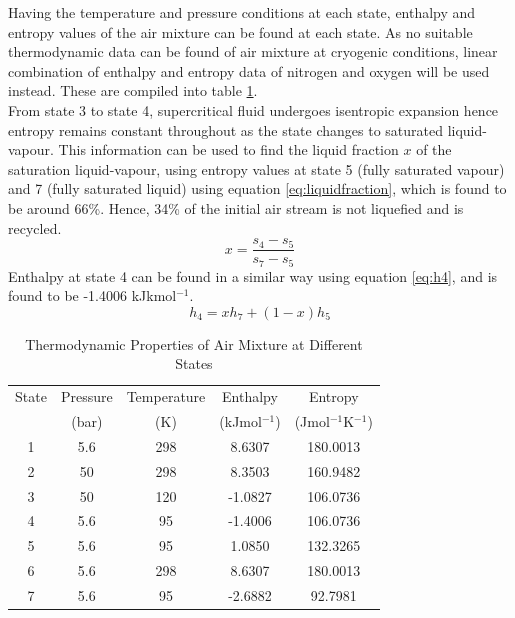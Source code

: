         \noindent Having the temperature and pressure conditions at each state, enthalpy and entropy values of the air mixture can be found at each state. As no suitable thermodynamic data can be found of air mixture at cryogenic conditions, linear combination of enthalpy and entropy data of nitrogen and oxygen will be used instead. These are compiled into table \ref{table:air_thermodata}. \\
        From state 3 to state 4, supercritical fluid undergoes isentropic expansion hence entropy remains constant throughout as the state changes to saturated liquid-vapour. This information can be used to find the liquid fraction $x$ of the saturation liquid-vapour, using entropy values at state 5 (fully saturated vapour) and 7 (fully saturated liquid) using equation \ref{eq:liquidfraction}, which is found to be around 66\%. Hence, 34\% of the initial air stream is not liquefied and is recycled.
        \begin{equation}
            x = \frac{s_4 - s_5}{s_7 - s_5}
            \label{eq:liquidfraction}
        \end{equation}
        Enthalpy at state 4 can be found in a similar way using equation \ref{eq:h4}, and is found to be -1.4006 kJkmol$^{-1}$.
        \begin{equation}
            h_4 = xh_7+(1-x)h_5
            \label{eq:h4}
        \end{equation}
        \begin{table}[H]
            \singlespacing
        	\centering
    	    \caption{Thermodynamic Properties of Air Mixture at Different States \citep{nist}}
    	    \label{table:air_thermodata}
    	    \begin{tabular}{|c|cc|cc|}
    	    \hline
    	    State   & Pressure  & Temperature   & Enthalpy  & Entropy \\
    	            & (bar)     & (K)           & (kJmol$^{-1}$) & (Jmol$^{-1}$K$^{-1}$) \\
    	    \hline
    	    1       & 5.6       & 298           & 8.6307    & 180.0013 \\
    	    2       & 50        & 298           & 8.3503    & 160.9482 \\
    	    3       & 50        & 120           & -1.0827   & 106.0736 \\
    	    4       & 5.6       & 95            & -1.4006   & 106.0736 \\
    	    5       & 5.6       & 95            & 1.0850    & 132.3265 \\
    	    6       & 5.6       & 298           & 8.6307    & 180.0013 \\
    	    7       & 5.6       & 95            & -2.6882   & 92.7981 \\    \hline
    	    \end{tabular}
    	    
        \end{table}
